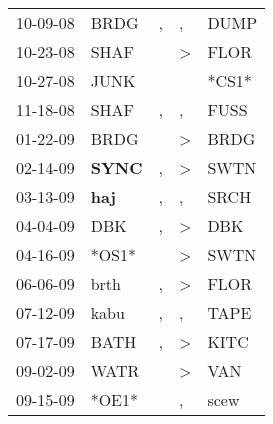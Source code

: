 \begin{supertabular}{p{0.07\textwidth}p{0.06\textwidth}p{0.02\textwidth}p{0.02\textwidth}p{0.06\textwidth}}
          10-09-08\textsuperscript{} &           BRDG\textsuperscript{} &                , &                , &           DUMP\textsuperscript{} \\
          10-23-08\textsuperscript{} &           SHAF\textsuperscript{} &                  &     \textgreater &           FLOR\textsuperscript{} \\
          10-27-08\textsuperscript{} &           JUNK\textsuperscript{} &                  &                  &                            *CS1* \\
          11-18-08\textsuperscript{} &           SHAF\textsuperscript{} &                , &                , &           FUSS\textsuperscript{} \\
          01-22-09\textsuperscript{} &           BRDG\textsuperscript{} &                  &     \textgreater &           BRDG\textsuperscript{} \\
          02-14-09\textsuperscript{} &  \textbf{SYNC\textsuperscript{}} &                , &     \textgreater &           SWTN\textsuperscript{} \\
          03-13-09\textsuperscript{} &   \textbf{haj\textsuperscript{}} &                , &                , &           SRCH\textsuperscript{} \\
          04-04-09\textsuperscript{} &            DBK\textsuperscript{} &                , &     \textgreater &            DBK\textsuperscript{} \\
          04-16-09\textsuperscript{} &                            *OS1* &                  &     \textgreater &           SWTN\textsuperscript{} \\
          06-06-09\textsuperscript{} &           brth\textsuperscript{} &                , &     \textgreater &           FLOR\textsuperscript{} \\
          07-12-09\textsuperscript{} &           kabu\textsuperscript{} &                , &                , &           TAPE\textsuperscript{} \\
          07-17-09\textsuperscript{} &           BATH\textsuperscript{} &                , &     \textgreater &           KITC\textsuperscript{} \\
          09-02-09\textsuperscript{} &           WATR\textsuperscript{} &                  &     \textgreater &            VAN\textsuperscript{} \\
          09-15-09\textsuperscript{} &                            *OE1* &                  &                , &           scew\textsuperscript{} \\

\end{supertabular}
